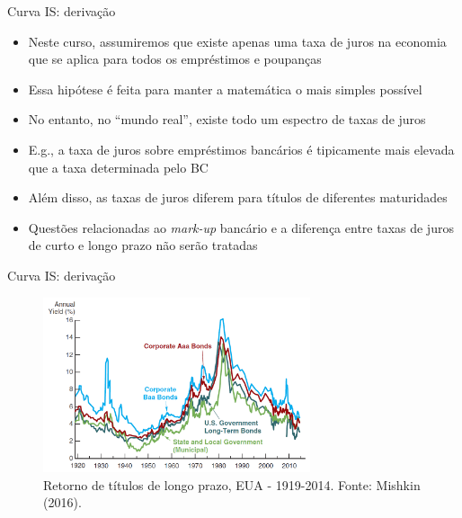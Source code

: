 \documentclass[10pt]{beamer}
\begin{document}
\begin{frame}{Curva IS: derivação}
    \begin{itemize}
        \item Neste curso, assumiremos que existe apenas uma taxa de juros na economia que se aplica para todos os empréstimos e poupanças\bigskip

        \item Essa hipótese é feita para manter a matemática o mais simples possível\bigskip

        \item No entanto, no ``mundo real'', existe todo um espectro de taxas de juros\bigskip

        \item E.g., a taxa de juros sobre empréstimos bancários é tipicamente mais elevada que a taxa determinada pelo BC\bigskip

        \item Além disso, as taxas de juros diferem para títulos de diferentes maturidades\bigskip

        \item Questões relacionadas ao \emph{mark-up} bancário e a diferença entre taxas de juros de curto e longo prazo não serão tratadas
    \end{itemize}
\end{frame}

\begin{frame}{Curva IS: derivação}
    \begin{figure}
        \centering
        \includegraphics[width=0.7\textwidth]{./figures/aula6_fig4.PNG}
        \caption{Retorno de títulos de longo prazo, EUA - 1919-2014. Fonte: Mishkin (2016).}
        \label{aula6_fig4}
    \end{figure}
\end{frame}
\end{document}

